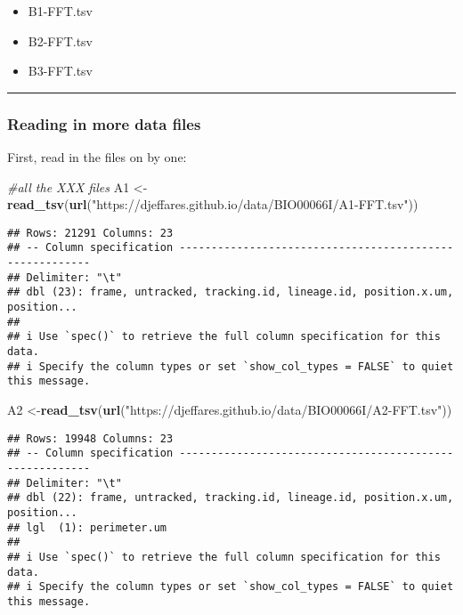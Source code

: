 \documentclass[
]{article}
\newenvironment{Shaded}{\begin{snugshade}}{\end{snugshade}}
\newcommand{\CommentTok}[1]{\textcolor[rgb]{0.56,0.35,0.01}{\textit{#1}}}
\newcommand{\FunctionTok}[1]{\textcolor[rgb]{0.13,0.29,0.53}{\textbf{#1}}}
\newcommand{\NormalTok}[1]{#1}
\newcommand{\OtherTok}[1]{\textcolor[rgb]{0.56,0.35,0.01}{#1}}
\newcommand{\StringTok}[1]{\textcolor[rgb]{0.31,0.60,0.02}{#1}}
\providecommand{\tightlist}{%
  \setlength{\itemsep}{0pt}\setlength{\parskip}{0pt}}
\begin{document}
\begin{itemize}
\tightlist
\item
  B1-FFT.tsv
\item
  B2-FFT.tsv\\
\item
  B3-FFT.tsv
\end{itemize}

\begin{center}\rule{0.5\linewidth}{0.5pt}\end{center}

\hypertarget{reading-in-more-data-files}{%
\subsubsection{Reading in more data
files}\label{reading-in-more-data-files}}

First, read in the files on by one:

\begin{Shaded}
\begin{Highlighting}[]
\CommentTok{\#all the XXX files}
\NormalTok{A1 }\OtherTok{\textless{}{-}}\FunctionTok{read\_tsv}\NormalTok{(}\FunctionTok{url}\NormalTok{(}\StringTok{"https://djeffares.github.io/data/BIO00066I/A1{-}FFT.tsv"}\NormalTok{))}
\end{Highlighting}
\end{Shaded}

\begin{verbatim}
## Rows: 21291 Columns: 23
## -- Column specification --------------------------------------------------------
## Delimiter: "\t"
## dbl (23): frame, untracked, tracking.id, lineage.id, position.x.um, position...
## 
## i Use `spec()` to retrieve the full column specification for this data.
## i Specify the column types or set `show_col_types = FALSE` to quiet this message.
\end{verbatim}

\begin{Shaded}
\begin{Highlighting}[]
\NormalTok{A2 }\OtherTok{\textless{}{-}}\FunctionTok{read\_tsv}\NormalTok{(}\FunctionTok{url}\NormalTok{(}\StringTok{"https://djeffares.github.io/data/BIO00066I/A2{-}FFT.tsv"}\NormalTok{))}
\end{Highlighting}
\end{Shaded}

\begin{verbatim}
## Rows: 19948 Columns: 23
## -- Column specification --------------------------------------------------------
## Delimiter: "\t"
## dbl (22): frame, untracked, tracking.id, lineage.id, position.x.um, position...
## lgl  (1): perimeter.um
## 
## i Use `spec()` to retrieve the full column specification for this data.
## i Specify the column types or set `show_col_types = FALSE` to quiet this message.
\end{verbatim}
\end{document}
